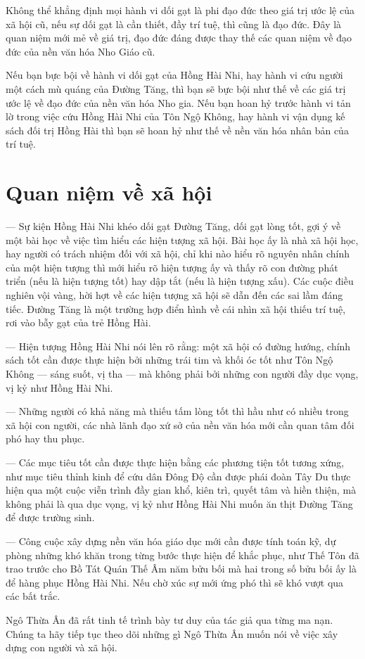Không thể khẳng định mọi hành vi dối gạt là phi đạo đức theo giá trị ước lệ của xã hội cũ, nếu sự dối gạt là cần thiết, đầy trí tuệ, thì cũng là đạo đức. Đây là quan niệm mới mẻ về giá trị, đạo đức đáng được thay thế các quan niệm về đạo đức của nền văn hóa Nho Giáo cũ.

Nếu bạn bực bội về hành vi dối gạt của Hồng Hài Nhi, hay hành vi cứu người một cách mù quáng của Đường Tăng, thì bạn sẽ bực bội như thế về các giá trị ước lệ về đạo đức của nền văn hóa Nho gia. Nếu bạn hoan hỷ trước hành vi tản lờ trong việc cứu Hồng Hài Nhi của Tôn Ngộ Không, hay hành vi vận dụng kế sách đối trị Hồng Hài thì bạn sẽ hoan hỷ như thế về nền văn hóa nhân bản của trí tuệ.

\section{Quan niệm về xã hội} %
\label{sec:40_41_xa_hoi}

— Sự kiện Hồng Hài Nhi khéo dối gạt Đường Tăng, dối gạt lòng tốt, gợi ý về một bài học về việc tìm hiểu các hiện tượng xã hội. Bài học ấy là nhà xã hội học, hay người có trách nhiệm đối với xã hội, chỉ khi nào hiểu rõ nguyên nhân chính của một hiện tượng thì mới hiểu rõ hiện tượng ấy và thấy rõ con đường phát triển (nếu là hiện tượng tốt) hay dập tắt (nếu là hiện tượng xấu). Các cuộc điều nghiên vội vàng, hời hợt về các hiện tượng xã hội sẽ dẫn đến các sai lầm đáng tiếc. Đường Tăng là một trường hợp điển hình về cái nhìn xã hội thiếu trí tuệ, rơi vào bẫy gạt của trẻ Hồng Hài.

— Hiện tượng Hồng Hài Nhi nói lên rõ rằng: một xã hội có đường hướng, chính sách tốt cần được thực hiện bởi những trái tim và khối óc tốt như Tôn Ngộ Không — sáng suốt, vị tha — mà không phải bởi những con người đầy dục vọng, vị kỷ như Hồng Hài Nhi.

— Những người có khả năng mà thiếu tấm lòng tốt thì hầu như có nhiều trong xã hội con người, các nhà lãnh đạo xứ sở của nền văn hóa mới cần quan tâm đối phó hay thu phục.

— Các mục tiêu tốt cần được thực hiện bằng các phương tiện tốt tương xứng, như mục tiêu thỉnh kinh để cứu dân Đông Độ cần được phái đoàn Tây Du thực hiện qua một cuộc viễn trình đầy gian khổ, kiên trì, quyết tâm và hiền thiện, mà không phải là qua dục vọng, vị kỷ như Hồng Hài Nhi muốn ăn thịt Đường Tăng để được trường sinh.

— Công cuộc xây dựng nền văn hóa giáo dục mới cần được tính toán kỹ, dự phòng những khó khăn trong từng bước thực hiện để khắc phục, như Thế Tôn đã trao trước cho Bồ Tát Quán Thế Âm năm bửu bối mà hai trong số bửu bối ấy là để hàng phục Hồng Hài Nhi. Nếu chờ xúc sự mới ứng phó thì sẽ khó vượt qua các bất trắc.

Ngô Thừa Ân đã rất tinh tế trình bày tư duy của tác giả qua từng ma nạn. Chúng ta hãy tiếp tục theo dõi những gì Ngô Thừa Ân muốn nói về việc xây dựng con người và xã hội.
